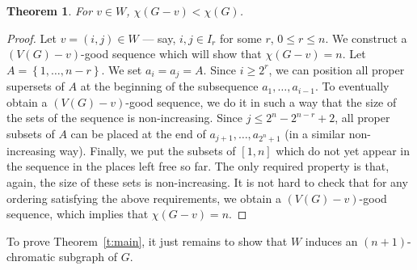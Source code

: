 \documentclass{article}
\newtheorem{theorem}{Theorem}
\newcommand\Setx[1] {\left\{{#1}\right\}}
\begin{document}
\begin{theorem}\label{t:crit-v}
  For $v\in W$, $\chi(G-v) < \chi(G)$.
\end{theorem}
\begin{proof}
  Let $v = (i,j)\in W$ --- say, $i,j\in I_r$ for
  some $r$, $0\leq r\leq n$. We construct a $(V(G)-v)$-good sequence
  which will show that $\chi(G-v) = n$. Let $A =
  \Setx{1,\dots,n-r}$. We set $a_i = a_j = A$. Since $i \geq 2^r$, we
  can position all proper supersets of $A$ at the beginning of the subsequence
  $a_1,\dots,a_{i-1}$. To eventually obtain a $(V(G)-v)$-good sequence,
  we do it in such a way that the size of the sets of the sequence is
  non-increasing. Since $j \leq 2^n - 2^{n-r} + 2$, all proper subsets of $A$
  can be placed at the end of $a_{j+1},\dots,a_{2^n+1}$ (in a similar
  non-increasing way). Finally, we put the subsets of $[1,n]$ which do
  not yet appear in the sequence in the places left free so far. The
  only required property is that, again, the size of these sets is
  non-increasing. It is not hard to check that
  for any ordering satisfying the above requirements, we obtain a
  $(V(G)-v)$-good sequence, which implies that $\chi(G-v) = n$.
\end{proof}

To prove Theorem~\ref{t:main}, it just remains to show that $W$
induces an $(n+1)$-chromatic subgraph of $G$.
\end{document}

